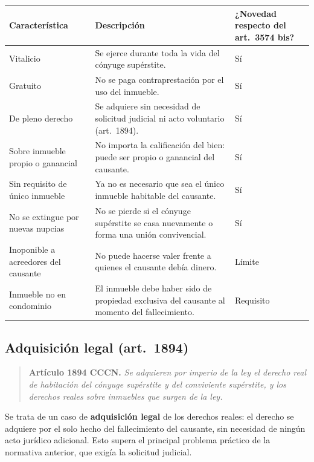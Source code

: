 \documentclass[12pt,oneside]{book}
\begin{document}
\begin{table}[H]
\centering
\begin{tabularx}{\textwidth}{@{}>{\raggedright\arraybackslash}p{}>{\raggedright\arraybackslash}X>{\raggedright\arraybackslash}p{}@{}}
\toprule
\textbf{Característica} & \textbf{Descripción} & \textbf{¿Novedad respecto del art.~3574 bis?} \\
\midrule
Vitalicio & Se ejerce durante toda la vida del cónyuge supérstite. & Sí \\
Gratuito & No se paga contraprestación por el uso del inmueble. & Sí \\
De pleno derecho & Se adquiere sin necesidad de solicitud judicial ni acto voluntario (art.~1894). & Sí \\
Sobre inmueble propio o ganancial & No importa la calificación del bien: puede ser propio o ganancial del causante. & Sí \\
Sin requisito de único inmueble & Ya no es necesario que sea el único inmueble habitable del causante. & Sí \\
No se extingue por nuevas nupcias & No se pierde si el cónyuge supérstite se casa nuevamente o forma una unión convivencial. & Sí \\
Inoponible a acreedores del causante & No puede hacerse valer frente a quienes el causante debía dinero. & Límite \\
Inmueble no en condominio & El inmueble debe haber sido de propiedad exclusiva del causante al momento del fallecimiento. & Requisito \\
\bottomrule
\end{tabularx}
\end{table}

\subsection{Adquisición legal (art.~1894)}

\begin{quote}
\textbf{Artículo 1894 CCCN.} \textit{Se adquieren por imperio de la ley el derecho real de habitación del cónyuge supérstite y del conviviente supérstite, y los derechos reales sobre inmuebles que surgen de la ley.}
\end{quote}

Se trata de un caso de \textbf{adquisición legal} de los derechos reales: el derecho se adquiere por el solo hecho del fallecimiento del causante, sin necesidad de ningún acto jurídico adicional. Esto supera el principal problema práctico de la normativa anterior, que exigía la solicitud judicial.
\end{document}
